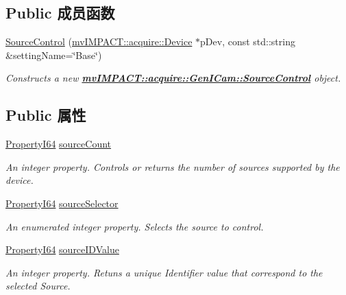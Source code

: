 \subsection*{Public 成员函数}
\begin{DoxyCompactItemize}
\item 
\hyperlink{classmv_i_m_p_a_c_t_1_1acquire_1_1_gen_i_cam_1_1_source_control_a903a4942b9a702640f4554df8fc0c475}{Source\+Control} (\hyperlink{classmv_i_m_p_a_c_t_1_1acquire_1_1_device}{mv\+I\+M\+P\+A\+C\+T\+::acquire\+::\+Device} $\ast$p\+Dev, const std\+::string \&setting\+Name=\char`\"{}Base\char`\"{})
\begin{DoxyCompactList}\small\item\em Constructs a new {\bfseries \hyperlink{classmv_i_m_p_a_c_t_1_1acquire_1_1_gen_i_cam_1_1_source_control}{mv\+I\+M\+P\+A\+C\+T\+::acquire\+::\+Gen\+I\+Cam\+::\+Source\+Control}} object. \end{DoxyCompactList}\end{DoxyCompactItemize}
\subsection*{Public 属性}
\begin{DoxyCompactItemize}
\item 
\hyperlink{group___common_interface_ga81749b2696755513663492664a18a893}{Property\+I64} \hyperlink{classmv_i_m_p_a_c_t_1_1acquire_1_1_gen_i_cam_1_1_source_control_a098ebb10aed503b6165aac8af7df0c2a}{source\+Count}
\begin{DoxyCompactList}\small\item\em An integer property. Controls or returns the number of sources supported by the device. \end{DoxyCompactList}\item 
\hyperlink{group___common_interface_ga81749b2696755513663492664a18a893}{Property\+I64} \hyperlink{classmv_i_m_p_a_c_t_1_1acquire_1_1_gen_i_cam_1_1_source_control_ae497dbadb257fb930ace8ad92c36cfea}{source\+Selector}
\begin{DoxyCompactList}\small\item\em An enumerated integer property. Selects the source to control. \end{DoxyCompactList}\item 
\hyperlink{group___common_interface_ga81749b2696755513663492664a18a893}{Property\+I64} \hyperlink{classmv_i_m_p_a_c_t_1_1acquire_1_1_gen_i_cam_1_1_source_control_af68d602d042f8caa1f962cd7c178d598}{source\+I\+D\+Value}
\begin{DoxyCompactList}\small\item\em An integer property. Retuns a unique Identifier value that correspond to the selected Source. \end{DoxyCompactList}\end{DoxyCompactItemize}


